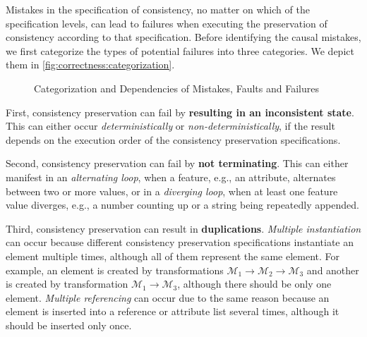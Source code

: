 Mistakes in the specification of consistency, no matter on which of the specification levels, %
can lead to failures when executing the preservation of consistency according to that specification. %
Before identifying the causal mistakes, we first categorize the types of potential failures into three categories. We depict them in \autoref{fig:correctness:categorization}.

\begin{figure}
    \centering
    
    \caption{Categorization and Dependencies of Mistakes, Faults and Failures}
    \label{fig:correctness:categorization}
\end{figure}

First, consistency preservation can fail by \textbf{resulting in an inconsistent state}. This can either occur \emph{deterministically} or \emph{non-deterministically}, if the result depends on the execution order of the consistency preservation specifications.

Second, consistency preservation can fail by \textbf{not terminating}. This can either manifest in an \emph{alternating loop}, when a feature, e.g., an attribute, alternates between two or more values, or in a \emph{diverging loop}, when at least one feature value diverges, e.g., a number counting up or a string being repeatedly appended.

Third, consistency preservation can result in \textbf{duplications}. \emph{Multiple instantiation} can occur because different consistency preservation specifications instantiate an element multiple times, although all of them represent the same element. %
For example, an element is created by transformations $\mathcal{M}_1 \rightarrow \mathcal{M}_2 \rightarrow \mathcal{M}_3$ and another is created by transformation $\mathcal{M}_1 \rightarrow \mathcal{M}_3$, although there should be only one element.
\emph{Multiple referencing} can occur due to the same reason because an element is inserted into a reference or attribute list several times, although it should be inserted only once. 



